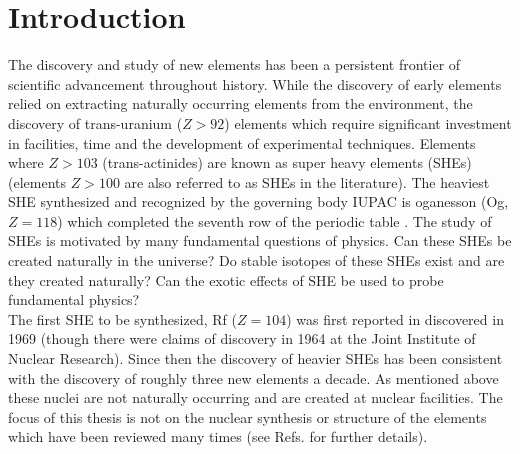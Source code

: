 \documentclass[10pt,a4paper, twoside, openright]{report}
\begin{document}
\chapter{Introduction} \label{chap:P2Intro}
The discovery and study of new elements has been a persistent frontier of scientific advancement throughout history. While the discovery of early elements relied on extracting naturally occurring elements from the environment, the discovery of trans-uranium ($Z>92$) elements which require significant investment in facilities, time and the development of experimental techniques. Elements where $Z>103$ (trans-actinides) are known as super heavy elements (SHEs) (elements $Z>100$ are also referred to as SHEs in the literature). The heaviest SHE synthesized and recognized by the governing body IUPAC is oganesson (Og, $Z=118$) which completed the seventh row of the periodic table \cite{Karol2016}. The study of SHEs is motivated by many fundamental questions of physics. Can these SHEs be created naturally in the universe? Do stable isotopes of these SHEs exist and are they created naturally? Can the exotic effects of SHE be used to probe fundamental physics?  \\
\linebreak
The first SHE to be synthesized, Rf ($Z=104$) was first reported in discovered in 1969 \cite{Ghoirso1974} (though there were claims of discovery in 1964 at the Joint Institute of Nuclear Research). Since then the discovery of heavier SHEs has been consistent with the discovery of roughly three new elements a decade. As mentioned above these nuclei are not naturally occurring and are created at nuclear facilities. The focus of this thesis is not on the nuclear synthesis or structure of the elements which have been reviewed many times (see Refs. \cite{HHO2013, Nilsson1969SHE, Giuliani2019, Nix1972, Cwiok2005, Hofmann2015, Oganessian2015, Oganessian2017, Nazarewicz2018} for further details). \\
\linebreak
\end{document}
